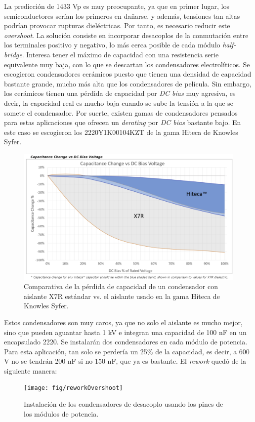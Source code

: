 La predicción de 1433 Vp es muy preocupante, ya que en primer lugar, los semiconductores serían los primeros en dañarse, y además, tensiones tan altas podrían provocar rupturas dieléctricas. Por tanto, es necesario reducir este \textit{overshoot}. La solución consiste en incorporar desacoplos de la conmutación entre los terminales positivo y negativo, lo más cerca posible de cada módulo \textit{half-bridge}. Interesa tener el máximo de capacidad con una resistencia serie equivalente muy baja, con lo que se descartan los condensadores electrolíticos. Se escogieron condensadores cerámicos puesto que tienen una densidad de capacidad bastante grande, mucho más alta que los condensadores de película. Sin embargo, los cerámicos tienen una pérdida de capacidad por \textit{DC bias} muy agresiva, es decir, la capacidad real es mucho baja  cuando se sube la tensión a la que se somete el condensador. Por suerte, existen gamas de condensadores pensados para estas aplicaciones que ofrecen un \textit{derating} por \textit{DC bias} bastante bajo. En este caso se escogieron los 2220Y1K00104KZT de la gama Hiteca de Knowles Syfer.

\begin{figure}[H]
	\centering
	\includegraphics[width=0.7\linewidth]{fig/hiteca}
	\caption{Comparativa de la pérdida de capacidad de un condensador con aislante X7R estándar vs. el aislante usado en la gama Hiteca de Knowles Syfer.}
\end{figure}

Estos condensadores son muy caros, ya que no solo el aislante es mucho mejor, sino que pueden aguantar hasta 1 kV e integran una capacidad de 100 nF en un encapsulado 2220. Se instalarán dos condensadores en cada módulo de potencia. Para esta aplicación, tan solo se perdería un 25\% de la capacidad, es decir, a 600 V no se tendrán 200 nF si no 150 nF, que ya es bastante. El \textit{rework} quedó de la siguiente manera:


\begin{figure}[H]
	\centering
	\texttt{[image: fig/reworkOvershoot]}
	\caption{Instalación de los condensadores de desacoplo usando los pines de los módulos de potencia.}
\end{figure}

